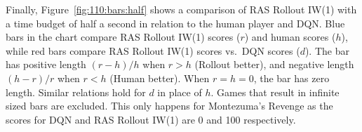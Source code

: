 \documentclass[letterpaper]{article}
\newcommand{\Omit}[1]{}
\newcommand{\CHECK}[1]{\textcolor{red}{\bf *** #1 ***}}
\begin{document}
Finally, Figure~\ref{fig:110:bars:half} shows a comparison of RAS Rollout IW(1)
with a time budget of half a second in relation to the human player and DQN.
Blue bars in the chart compare RAS Rollout IW(1) scores ($r$) and human scores
($h$), while red bars compare RAS Rollout IW(1) scores vs.\ DQN scores ($d$). 
The bar has positive length $(r-h)/h$ when $r>h$ (Rollout better), and negative
length $(h-r)/r$ when $r<h$ (Human better).  When $r=h=0$, the bar has zero length.
Similar relations hold for $d$ in place of $h$. 
Games that result in infinite sized bars are excluded. This only happens for
Montezuma's Revenge as the scores for DQN and RAS Rollout IW(1) are
0 and 100 respectively.

%    
\end{document}
